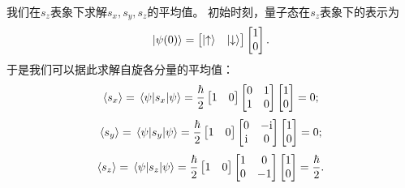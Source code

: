 \begin{tcolorbox}[breakable, title={\textbf{自旋}}]
    我们在$s_z$表象下求解$s_x,s_y,s_z$的平均值。
    初始时刻，量子态在$s_z$表象下的表示为
    \begin{equation}
        \ket{\psi(0)} =
        \begin{bmatrix}
            \ket{\uparrow} & \ket{\downarrow}
        \end{bmatrix}
        \begin{bmatrix}
            1 \\ 0
        \end{bmatrix}.
    \end{equation}
    于是我们可以据此求解自旋各分量的平均值：
    \begin{equation}
        \expval{s_x} = \mel{\psi}{s_x}{\psi} = \frac{\hbar}{2}
        \begin{bmatrix}
            1 & 0
        \end{bmatrix}
        \begin{bmatrix}
            0 & 1 \\ 1 & 0\\
        \end{bmatrix}
        \begin{bmatrix}
            1 \\ 0
        \end{bmatrix}
        = 0;
    \end{equation}
    \begin{equation}
        \expval{s_y} = \mel{\psi}{s_y}{\psi} = \frac{\hbar}{2}
        \begin{bmatrix}
            1 & 0
        \end{bmatrix}
        \begin{bmatrix}
            0 & -\mathrm{i} \\ \mathrm{i} & 0\\
        \end{bmatrix}
        \begin{bmatrix}
            1 \\ 0
        \end{bmatrix}
        = 0;
    \end{equation}
    \begin{equation}
        \expval{s_z} = \mel{\psi}{s_z}{\psi} = \frac{\hbar}{2}
        \begin{bmatrix}
            1 & 0
        \end{bmatrix}
        \begin{bmatrix}
            1 & 0 \\ 0 & -1\\
        \end{bmatrix}
        \begin{bmatrix}
            1 \\ 0
        \end{bmatrix}
        = \frac{\hbar}{2}.
    \end{equation}


\end{tcolorbox}
